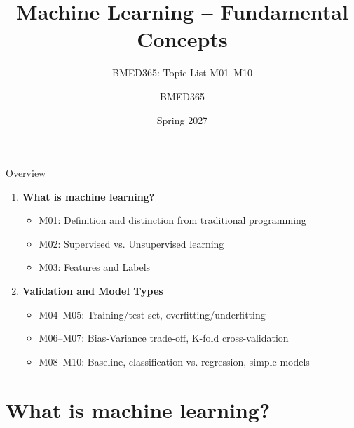 \documentclass[aspectratio=169, 10pt]{beamer}
\title{Machine Learning -- Fundamental Concepts}
\subtitle{BMED365: Topic List M01--M10}
\author{BMED365}
\date{Spring 2027}
\begin{document}
\begin{frame}
    \titlepage
\end{frame}

\begin{frame}{Overview}
    \begin{enumerate}
        \item \textbf{What is machine learning?}
        \begin{itemize}
            \item M01: Definition and distinction from traditional programming
            \item M02: Supervised vs. Unsupervised learning
            \item M03: Features and Labels
        \end{itemize}
        \item \textbf{Validation and Model Types}
        \begin{itemize}
            \item M04--M05: Training/test set, overfitting/underfitting
            \item M06--M07: Bias-Variance trade-off, K-fold cross-validation
            \item M08--M10: Baseline, classification vs. regression, simple models
        \end{itemize}
    \end{enumerate}
\end{frame}

\section{What is machine learning?}
\end{document}
